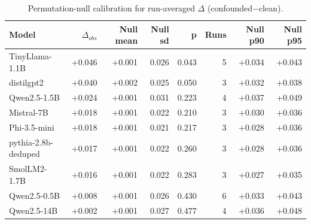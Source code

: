 \begin{table}[t]
\centering
\caption{Permutation-null calibration for run-averaged $\Delta$ (confounded$-$clean).}
\label{tab:perm_null}
\begin{tabular}{lrrrrrrr}
\toprule
Model & $\Delta_{obs}$ & Null mean & Null sd & p & Runs & Null p90 & Null p95 \\
\midrule
TinyLlama-1.1B & +0.046 & +0.001 & 0.026 & 0.043 & 5 & +0.034 & +0.043 \\
distilgpt2 & +0.040 & +0.002 & 0.025 & 0.050 & 3 & +0.032 & +0.038 \\
Qwen2.5-1.5B & +0.024 & +0.001 & 0.031 & 0.223 & 4 & +0.037 & +0.049 \\
Mistral-7B & +0.018 & +0.001 & 0.022 & 0.210 & 3 & +0.030 & +0.036 \\
Phi-3.5-mini & +0.018 & +0.001 & 0.021 & 0.217 & 3 & +0.028 & +0.036 \\
pythia-2.8b-deduped & +0.017 & +0.001 & 0.022 & 0.260 & 3 & +0.028 & +0.036 \\
SmolLM2-1.7B & +0.016 & +0.001 & 0.022 & 0.283 & 3 & +0.027 & +0.035 \\
Qwen2.5-0.5B & +0.008 & +0.001 & 0.026 & 0.430 & 6 & +0.033 & +0.043 \\
Qwen2.5-14B & +0.002 & +0.001 & 0.027 & 0.477 & 4 & +0.036 & +0.048 \\
\bottomrule
\end{tabular}
\end{table}
